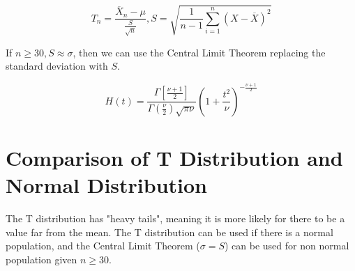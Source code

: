 \documentclass[12pt]{article}
\begin{document}
$$T_n = \frac{\overline{X}_n - \mu}{\frac{S}{\sqrt{n}}}, S = \sqrt{\frac{1}{n-1} \sum_{i=1}^n (X-\overline{X})^2}$$

If $n \geq 30, S \approx \sigma$, then we can use the Central Limit Theorem replacing the standard deviation with $S$.

\begin{defn}[T Distribution]
	$$H(t) = \frac{\Gamma\left[\frac{\nu+1}{2}\right]}{\Gamma\left(\frac{\nu}{2}\right)\sqrt{\pi\nu}} \left(1 + \frac{t^2}{\nu}\right)^{-\frac{\nu+1}{2}}$$
\end{defn}

\section{Comparison of T Distribution and Normal Distribution}

The T distribution has "heavy tails", meaning it is more likely for there to be a value far from the mean. The T distribution can be used if there is a normal population, and the Central Limit Theorem ($\sigma = S$) can be used for non normal population given $n \geq 30$. 
\end{document}
